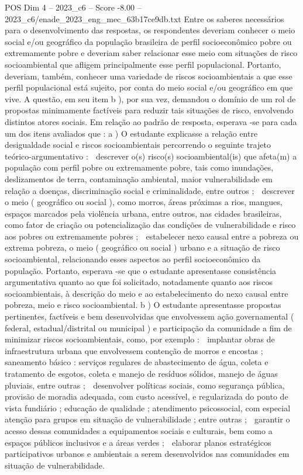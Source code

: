 \begin{textsample}{POS Dim 4 – 2023\_c6 – Score -8.00 – 2023\_c6/enade\_2023\_eng\_mec\_63b17ce9db.txt}
Entre os saberes necessários para o desenvolvimento das respostas, os respondentes deveriam conhecer o meio social e/ou geográfico da população brasileira de perfil socioeconômico pobre ou extremamente pobre e deveriam saber relacionar esse meio com situações de risco socioambiental que afligem principalmente esse perfil populacional.
Portanto, deveriam, também, conhecer uma variedade de riscos socioambientais a que esse perfil populacional está sujeito, por conta do meio social e/ou geográfico em que vive.
A questão, em seu item b ), por sua vez, demandou o domínio de um rol de propostas minimamente factíveis para reduzir tais situações de risco, envolvendo distintos atores sociais.
Em relação ao padrão de resposta, esperava -se para cada um dos itens avaliados que : a ) O estudante explicasse a relação entre desigualdade social e riscos socioambientais percorrendo o seguinte trajeto teórico-argumentativo :  descrever o(s) risco(s) socioambiental(is) que afeta(m) a população com perfil pobre ou extremamente pobre, tais como inundações, deslizamentos de terra, contaminação ambiental, maior vulnerabilidade em relação a doenças, discriminação social e criminalidade, entre outros ;  descrever o meio ( geográfico ou social ), como morros, áreas próximas a rios, mangues, espaços marcados pela violência urbana, entre outros, nas cidades brasileiras, como fator de criação ou potencialização das condições de vulnerabilidade e risco aos pobres ou extremamente pobres ;  estabelecer nexo causal entre a pobreza ou extrema pobreza, o meio ( geográfico ou social ) urbano e a situação de risco socioambiental, relacionando esses aspectos ao perfil socioeconômico da população.
Portanto, esperava -se que o estudante apresentasse consistência argumentativa quanto ao que foi solicitado, notadamente quanto aos riscos socioambientais, à descrição do meio e ao estabelecimento do nexo causal entre pobreza, meio e risco socioambiental. b ) O estudante apresentasse propostas pertinentes, factíveis e bem desenvolvidas que envolvessem ação governamental ( federal, estadual/distrital ou municipal ) e participação da comunidade a fim de minimizar riscos socioambientais, como, por exemplo :  implantar obras de infraestrutura urbana que envolvessem contenção de morros e encostas ; saneamento básico : serviços regulares de abastecimento de água, coleta e tratamento de esgotos, coleta e manejo de resíduos sólidos, manejo de águas pluviais, entre outras ;  desenvolver políticas sociais, como segurança pública, provisão de moradia adequada, com custo acessível, e regularizada do ponto de vista fundiário ; educação de qualidade ; atendimento psicossocial, com especial atenção para grupos em situação de vulnerabilidade ; entre outras ;  garantir o acesso dessas comunidades a equipamentos sociais e culturais, bem como a espaços públicos inclusivos e a áreas verdes ;  elaborar planos estratégicos participativos urbanos e ambientais a serem desenvolvidos nas comunidades em situação de vulnerabilidade.

\end{textsample}
